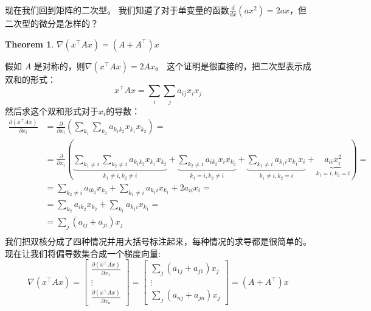 \documentclass[notitlepage,oneside]{book}
\newtheorem{theorem}{Theorem}
\begin{document}
现在我们回到矩阵的二次型。
我们知道了对于单变量的函数$\frac{d}{dx}(ax^2) = 2ax$，但二次型的微分是怎样的？
\begin{theorem}
$\nabla (x^\top A x) = (A+A^\top)x$
\end{theorem}
假如 $A$ 是对称的，则$\nabla (x^\top A x) = 2Ax$。
这个证明是很直接的，把二次型表示成双和的形式：
$$x^\top A x = \sum\limits_i\sum\limits_j a_{ij} x_i x_j$$
然后求这个双和形式对于$x_i$的导数：
\begin{align*}
\frac{\partial (x^\top A x)}{\partial x_i} 
&= \frac{\partial}{\partial x_i}  \left(\sum\limits_{k_1}\sum\limits_{k_2} a_{k_1 k_2} x_{k_1} x_{k_2}\right) = \\
&= \frac{\partial}{\partial x_i}  \left(
\underbrace{\sum\limits_{k_1\neq i}\sum\limits_{k_2\neq i} a_{k_1k_2}x_{k_1} x_{k_2}}_{k_1 \neq i, k_2 \neq i}+\underbrace{\sum\limits_{k_2\neq i} a_{ik_2}x_i x_{k_2}}_{k_1 = i, k_2\neq i}+
\underbrace{\sum\limits_{k_1\neq i} a_{k_1 i} x_{k_1} x_i}_{k_1 \neq i, k_2 = i}+
\underbrace{a_{ii}x_i^2}_{k_1 = i, k_2 = i}\right) = \\
& = \sum\limits_{k_2\neq i} a_{ik_2}x_{k_2} + \sum\limits_{k_1\neq i} a_{k_1 i} x_{k_1} + 2 a_{ii} x_i = \\
& = \sum\limits_{k_2} a_{ik_2}x_{k_2} + \sum\limits_{k_1} a_{k_1 i} x_{k_1} = \\
& = \sum\limits_{j} (a_{ij} + a_{ji}) x_j \\
\end{align*}
我们把双核分成了四种情况并用大括号标注起来，每种情况的求导都是很简单的。
现在让我们将偏导数集合成一个梯度向量:
$$\nabla(x^\top A x) = \begin{bmatrix}\frac{\partial (x^\top Ax)}{\partial x_1} \\ \vdots \\ \frac{\partial (x^\top A x)}{\partial x_n} \end{bmatrix}  = \begin{bmatrix}\sum\limits_{j} (a_{1j} + a_{j1}) x_j \\ \vdots \\ \sum\limits_{j} (a_{nj} + a_{jn}) x_j \end{bmatrix}  = (A+A^\top)x
$$
\end{document}
